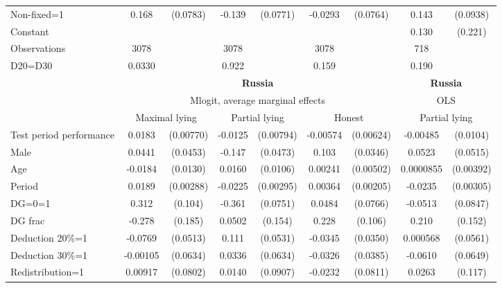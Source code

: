 \begin{tabular}{l|cccccc|cc}
Non-fixed=1     &    0.168\sym{**} & (0.0783)&   -0.139\sym{*}  & (0.0771)&  -0.0293         & (0.0764)&    0.143         & (0.0938)\\
Constant        &                  &         &                  &         &                  &         &    0.130         &  (0.221)\\
\hline
Observations    &     3078         &         &     3078         &         &     3078         &         &      718         &         \\
D20=D30         &   0.0330         &         &    0.922         &         &    0.159         &         &    0.190         &         \\
\hline\hline
&\multicolumn{6}{c|}{\bf Russia}&\multicolumn{2}{c}{\bf Russia}\\ &\multicolumn{6}{c|}{Mlogit, average marginal effects }&\multicolumn{2}{c}{OLS}\\
                &\multicolumn{2}{c}{Maximal lying}&\multicolumn{2}{c}{Partial lying}&\multicolumn{2}{c}{Honest}  &\multicolumn{2}{c}{Partial lying}\\
\hline
Test period performance&   0.0183\sym{**} &(0.00770)&  -0.0125         &(0.00794)& -0.00574         &(0.00624)& -0.00485         & (0.0104)\\
Male            &   0.0441         & (0.0453)&   -0.147\sym{***}& (0.0473)&    0.103\sym{***}& (0.0346)&   0.0523         & (0.0515)\\
Age             &  -0.0184         & (0.0130)&   0.0160         & (0.0106)&  0.00241         &(0.00502)&0.0000855         &(0.00392)\\
Period          &   0.0189\sym{***}&(0.00288)&  -0.0225\sym{***}&(0.00295)&  0.00364\sym{*}  &(0.00205)&  -0.0235\sym{***}&(0.00305)\\
DG=0=1          &    0.312\sym{***}&  (0.104)&   -0.361\sym{***}& (0.0751)&   0.0484         & (0.0766)&  -0.0513         & (0.0847)\\
DG frac         &   -0.278         &  (0.185)&   0.0502         &  (0.154)&    0.228\sym{**} &  (0.106)&    0.210         &  (0.152)\\
Deduction 20\%=1&  -0.0769         & (0.0513)&    0.111\sym{**} & (0.0531)&  -0.0345         & (0.0350)& 0.000568         & (0.0561)\\
Deduction 30\%=1& -0.00105         & (0.0634)&   0.0336         & (0.0634)&  -0.0326         & (0.0385)&  -0.0610         & (0.0649)\\
Redistribution=1&  0.00917         & (0.0802)&   0.0140         & (0.0907)&  -0.0232         & (0.0811)&   0.0263         &  (0.117)\\

\end{tabular}
